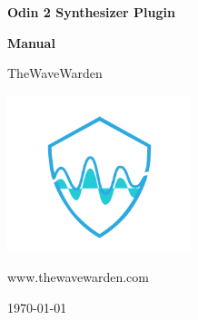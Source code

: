 \documentclass[12pt]{report}
\begin{document}
\begin{titlepage}
	\centering
	{\huge\bfseries Odin 2 Synthesizer Plugin\par}
        \vspace{2cm}
	{\Huge\bfseries Manual\par}
	\vspace{2cm}
	{\Large TheWaveWarden\par}
        \includegraphics[width=0.4\textwidth]{graphics/logo.png}\par
	{\large www.thewavewarden.com\par}
	\vfill

	{\large \today\par}
\end{titlepage}
\clearpage

\tableofcontents
\clearpage


\clearpage

\clearpage

\clearpage

\clearpage

\clearpage

\clearpage

\clearpage

\clearpage
\end{document}
